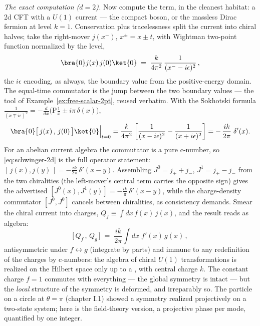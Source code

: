 \begin{eexample}
\emph{The exact computation ($d = 2$).} Now compute the term, in the cleanest
habitat: a 2d CFT with a $U(1)$ current --- the compact boson, or the
massless Dirac fermion at level $k = 1$. Conservation plus tracelessness
split the current into chiral halves; take the right-mover $j(x^-)$, $x^\pm =
x \pm t$, with Wightman two-point function normalized by the level,
\begin{equation}
\bra{0} j(x)\, j(0) \ket{0}
\;=\; \frac{k}{4\pi^2}\,\frac{1}{(x^- - i\epsilon)^2}\,,
\label{eq:jj-2d}
\end{equation}
the $i\epsilon$ encoding, as always, the boundary value from the
positive-energy domain. The equal-time commutator is the jump between the two
boundary values --- the tool of Example~\ref{ex:free-scalar-2pt}, reused
verbatim. With the Sokhotski formula $\frac{1}{(x \mp i\epsilon)^2} = -
\frac{d}{dx}\big(\mathrm{P}\frac1x \pm i\pi\,\delta(x)\big)$,
\begin{equation}
\bra{0}\big[\,j(x)\,,\,j(0)\,\big]\ket{0}\Big|_{t=0}
= \frac{k}{4\pi^2}\left[\frac{1}{(x-i\epsilon)^2} -
\frac{1}{(x+i\epsilon)^2}\right]
= -\,\frac{i k}{2\pi}\;\delta'(x).
\label{eq:schwinger-2d}
\end{equation}
For an abelian current algebra the commutator is a pure c-number, so
\eqref{eq:schwinger-2d} is the full operator statement: $[\,j(x), j(y)\,] =
-\frac{ik}{2\pi}\,\delta'(x-y)$. Assembling $J^0 = j_+ + j_-$, $J^1 = j_+ -
j_-$ from the two chiralities (the left-mover's central term carries the
opposite sign) gives the advertised $[J^0(x), J^1(y)] = -\frac{ik}{\pi}\,
\delta'(x - y)$, while the charge-density commutator $[J^0, J^0]$ cancels
between chiralities, as consistency demands. Smear the chiral current into
charges, $Q_f \equiv \int dx\, f(x)\, j(x)$, and the result reads as algebra:
\begin{equation}
\big[\, Q_f \,,\, Q_g \,\big] \;=\; \frac{ik}{2\pi} \int dx\; f'(x)\, g(x)\,,
\label{eq:central-extension}
\end{equation}
antisymmetric under $f \leftrightarrow g$ (integrate by parts) and immune to
any redefinition of the charges by c-numbers: the algebra of chiral $U(1)$
transformations is realized on the Hilbert space only up to a , with central charge $k$. The constant charge $f = 1$ commutes
with everything --- the global symmetry is intact --- but the
\emph{local} structure of the symmetry is deformed, and irreparably so. The
particle on a circle at $\theta = \pi$ (chapter I.1) showed a symmetry
realized projectively on a two-state system; here is the field-theory
version, a projective phase per mode, quantified by one integer.


\end{eexample}
